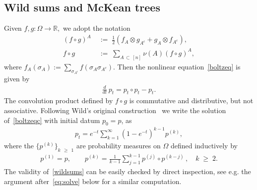 \documentclass[10pt,a4paper]{article}
\renewcommand{\geq}{\;\geqslant\;}
\newcommand{\Om}{\Omega}
\newcommand{\si}{\sigma}
\newcommand{\bbR}{\mathbb{R}}
\begin{document}
\subsection{Wild sums and McKean trees}

Given $f, g : \Om \rightarrow \bbR,$ we adopt the notation
\begin{align}
(f \circ g)^{A}\; &{:=}\; \frac{1}{2}\left(f_A \otimes g_{A^c}+ g_A \otimes f_{A^c} \right),\label{defconv1}\\
f \circ g \;&{:=}\; \sum_{A\,\subset\,[n]}\nu(A)(f \circ g)^{A},\label{defconv2}
\end{align}
where $f_A(\si_{A}) := \sum_{\si_{A^c}}f(\si_A\si_{A^c})$. Then the nonlinear equation~\eqref{boltzeq} is given by
\begin{align}\label{boltzeqc}
\frac{d}{dt}\,p_t = p_t\circ p_t - p_t.
\end{align}
The convolution product defined by $f\circ g$ is commutative and distributive, but not associative. Following Wild's original construction~\cite{Wild} we write the solution of~\eqref{boltzeqc} with initial datum $p_0=p$, as
\begin{align}\label{wildsums}
p_t = e^{-t}\sum_{k=1}^{\infty}\left(1-e^{-t}\right)^{k-1}p^{(k)},
\end{align}
where the $\{p^{(k)}\}_{k\,\geq\,1}$ are probability measures on $\Om$ defined inductively by
\begin{align}\label{eq:wildp}
p^{(1)}=p, \qquad p^{(k)} = \frac{1}{k-1}\sum_{j=1}^{k-1}p^{(j)}\circ p^{(k-j)}\,,\quad k\geq 2.
\end{align}
The validity of~\eqref{wildsums} can be easily checked by direct inspection, see e.g. the argument after~\eqref{eq:solve} below for a similar computation.
\end{document}
